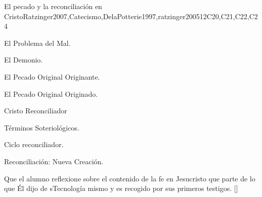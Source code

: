 \begin{syllabus}
\begin{unit}{}{El pecado y la reconciliación en Cristo}{Ratzinger2007,Catecismo,DelaPotterie1997,ratzinger2005}{12}{C20,C21,C22,C24}
\begin{topics}
	\item El Problema del Mal.
	    \begin{subtopics}
		\item El Demonio.
		\item El Pecado Original Originante.
		\item El Pecado Original Originado.
	    \end{subtopics}
	\item Cristo Reconciliador
	      \begin{subtopics}
		\item Términos Soteriológicos.
		\item Ciclo reconciliador.
		\item Reconciliación: Nueva Creación.
	      \end{subtopics}
\end{topics}
\begin{learningoutcomes}
	\item Que el alumno reflexione sobre el contenido de la fe en Jesucristo que parte de lo que Él dijo de sTecnología mismo y es recogido por sus primeros testigos. [\Familiarity]
\end{learningoutcomes}
\end{unit}


\end{syllabus}
